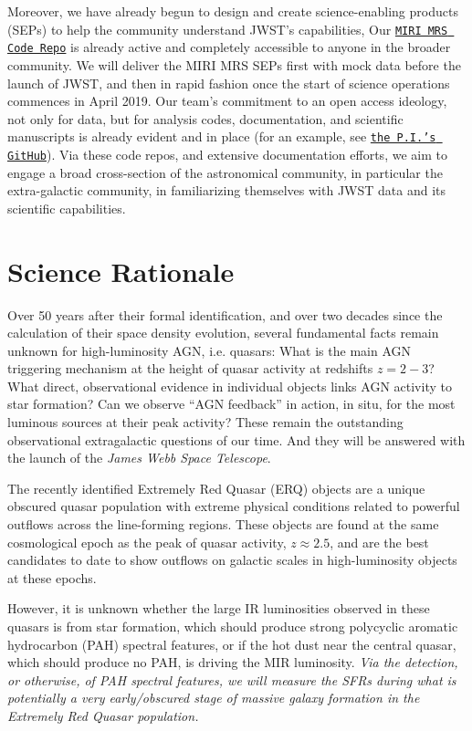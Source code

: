 \smallskip \smallskip
\noindent
Moreover, we have already begun to design and create science-enabling
products (SEPs) to help the community understand JWST's capabilities,
Our \href{https://github.com/miri-mrs}{{\tt MIRI MRS Code Repo}} is
already active and completely accessible to anyone in the broader
community.  We will deliver the MIRI MRS SEPs first with mock data
before the launch of JWST, and then in rapid fashion once the start of
science operations commences in April 2019.
Our team's commitment to an open access ideology, not only for data,
but for analysis codes, documentation, and scientific manuscripts is
already evident and in place (for an example, see
\href{https://github.com/d80b2t}{{\tt the P.I.'s GitHub}}).  Via these
code repos, and extensive documentation efforts, we aim to engage a
broad cross-section of the astronomical community, in particular the
extra-galactic community, in familiarizing themselves with JWST data
and its scientific capabilities.


\section*{Science Rationale}
\vspace{-6pt}
\noindent
Over 50 years after their formal identification, and over two decades
since the calculation of their space density evolution, several
fundamental facts remain unknown for high-luminosity AGN,
i.e. quasars: What is the main AGN triggering mechanism at the height
of quasar activity at redshifts $z=2-3$? What direct,
observational evidence in individual objects links AGN activity
to star formation?  Can we observe ``AGN feedback'' in action, in situ,  
for the most luminous sources at their peak activity? These remain the
outstanding observational extragalactic questions of our time. And
they will be answered with the launch of the {\it James Webb Space
Telescope}.

\smallskip \smallskip
\noindent
The recently identified Extremely Red Quasar (ERQ) objects are a
unique obscured quasar population with extreme physical conditions
related to powerful outflows across the line-forming regions. These
objects are found at the same cosmological epoch as the peak of quasar
activity, $z\approx2.5$, and are the best candidates to date to show
outflows on galactic scales in high-luminosity objects at these epochs. 

\smallskip \smallskip
\noindent
However, it is unknown whether the large IR luminosities observed in 
these quasars is from star formation, which should produce strong 
polycyclic aromatic hydrocarbon (PAH) spectral features, 
or if the hot dust near the central quasar, which should produce no PAH, 
is driving the MIR luminosity. 
{\it Via the detection, or otherwise, of PAH spectral features, we will 
measure the SFRs during what is potentially a very early/obscured stage 
of massive galaxy formation in the Extremely Red Quasar population.}

